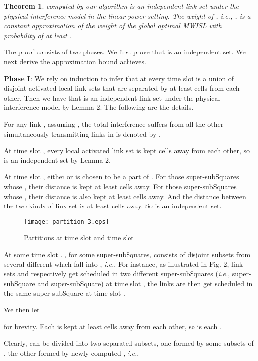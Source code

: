 \documentclass[journal]{IEEEtran}
\begin{document}
\newtheorem{theorem}{Theorem}
\begin{theorem}
 computed by our algorithm is an independent link set under the physical interference model in the linear power setting. The weight of , \emph{i.e.}, , is a constant approximation of the weight of the global optimal MWISL with probability of at least .
\label{theorem1}
\end{theorem}
\begin{IEEEproof}
The proof consists of two phases. We first prove that  is an independent set. We next derive the approximation bound   achieves.

\textbf{Phase I}: We rely on induction to infer that at every time slot  is a union of disjoint activated local link sets that are separated by at least  cells from each other. Then we have that  is an independent link set under the physical interference model by Lemma 2. The following are the details.

For any link , assuming , the total interference  suffers from all the other
simultaneously transmitting links in  is denoted by .

At time slot , every local activated link set  is kept 
cells away from each other, so  is an independent set by Lemma 2.

At time slot , either  or  is chosen to be a part of
. For those super-subSquares whose , their distance is kept at least  cells away. For those super-subSquares whose , their distance is also kept at least  cells away. And the distance between the two kinds of link set is at least  cells away. So  is an independent set.

\begin{figure}
\centering
\texttt{[image: partition-3.eps]}
\caption{Partitions at time slot  and time slot }
\end{figure}


At some time slot , , for some super-subSquares,
 consists of disjoint subsets from several
different   which fall into ,
\emph{i.e.},
{\small{
}}
  For instance, as illustrated in Fig. 2,  link sets  and  respectively get scheduled in two different super-subSquares (\emph{i.e.}, super-subSquare and super-subSquare) at time slot , the links  are then get scheduled in the same super-subSquare at time slot .


We then let

 for brevity. Each  is kept at least  cells away from each other,
so is each .


Clearly,  can be divided into two separated subsets, one formed by some subsets of , the other formed by newly computed , \emph{i.e.},
\vspace*{-0.5\baselineskip}
{\small{
\setlength{\arraycolsep}{0.0em}

}}
\end{IEEEproof}
\end{document}

